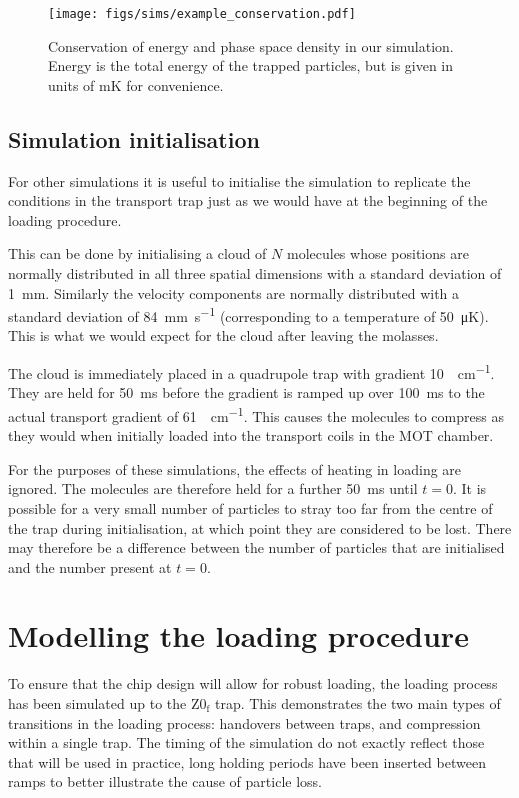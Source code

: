 \begin{figure}
  \centering
  \texttt{[image: figs/sims/example\_conservation.pdf]}
  \caption{Conservation of energy and phase space density in our simulation.
  Energy is the total energy of the trapped particles, but is given in units of
  \si{\milli\kelvin} for convenience.
  }
  \label{design:fig:conservation}
\end{figure}

\subsection{Simulation initialisation}

For other simulations it is useful to initialise the simulation to replicate
the conditions in the transport trap just as we would have at the beginning of
the loading procedure.

This can be done by initialising a cloud of $N$ molecules whose positions are
normally distributed in all three spatial dimensions with a standard deviation
of \SI{1}{\milli\meter}. Similarly the velocity components are normally
distributed with a standard deviation of \SI{84}{\milli\meter\per\second}
(corresponding to a temperature of \SI{50}{\micro\kelvin}). This is what we
would expect for the cloud after leaving the molasses.

The cloud is immediately placed in a quadrupole trap with gradient
\SI{10}{\gauss\per\centi\meter}. They are held for \SI{50}{\milli\second}
before the gradient is ramped up over \SI{100}{\milli\second} to the actual
transport gradient of \SI{61}{\gauss\per\centi\meter}. This causes the
molecules to compress as they would when initially loaded into the transport
coils in the MOT chamber.

For the purposes of these simulations, the effects of heating in loading are
ignored. The molecules are therefore held for a further \SI{50}{\milli\second}
until $t=0$. It is possible for a very small number of particles to stray too
far from the centre of the trap during initialisation, at which point they are
considered to be lost. There may therefore be a difference between the number
of particles that are initialised and the number present at $t=0$.

\section{Modelling the loading procedure}
\label{design:sim}

To ensure that the chip design will allow for robust loading, the loading
process has been simulated up to the $\mathrm{Z0_f}$ trap. This demonstrates
the two main types of transitions in the loading process: handovers between
traps, and compression within a single trap. The timing of the simulation do
not exactly reflect those that will be used in practice, long holding periods
have been inserted between ramps to better illustrate the cause of particle
loss.

